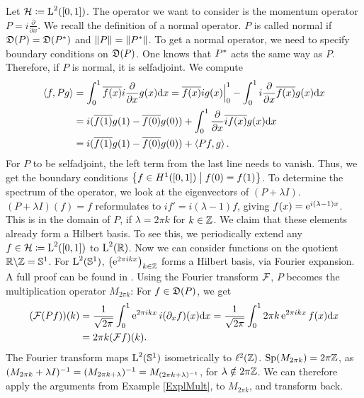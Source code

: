 \begin{expl}
 
 Let $\mathcal{H} \coloneqq \text{L}^2(\left[ 0, 1 \right])$. 
 The operator we want to consider is the momentum operator 
 $P = i \frac{\partial}{\partial x}$.
 We recall the definition of a normal operator.
 $P$ is called normal if $\mathfrak{D}(P) = \mathfrak{D}(P^{*})$ and 
 $\|P\| = \| P ^{*} \|$. To get a normal operator, we
 need to specify boundary conditions on $\mathfrak{D}(P)$. One knows that
 $P^{*}$ acts the same way as $P$. Therefore, if $P$ is normal,
 it is selfadjoint.
 We compute
 \begin{align*}
  \left\langle f, Pg \right\rangle 
 & =\int _0 ^1 \overline{f(x)} i \frac{\partial}{\partial x}g(x) \text{d}x
  = \overline{f(x)}ig(x)\Bigr|^{1}_{0}
  -\int _0 ^1 i \frac{\partial}{\partial x}\overline{f(x)} g(x) \text{d}x\\
&= i(\overline{f(1)}g(1)- \overline{f(0)}g(0))
+ \int _0 ^1 \frac{\partial}{\partial x}\overline{i f(x)} g(x) \text{d}x\\
&=i(\overline{f(1)}g(1)- \overline{f(0)}g(0)) 
+\left\langle Pf, g \right\rangle.
 \end{align*}
For $P$ to be selfadjoint, the left term from the last line needs 
to vanish. Thus, we get the boundary conditions 
 $\left\lbrace f \in H^1(\left[ 0,1 \right]) \bigm| f(0) = f(1) \right\rbrace$.
 To determine the spectrum of the operator, we look at 
 the eigenvectors of $(P+\lambda I)$.
 $(P+\lambda I)(f)=f$ reformulates to $i f' = i(\lambda - 1)f$, giving
 $f(x)= \operatorname{e}^{i(\lambda -1 )x}$. This is in the domain of $P$, if 
 $\lambda = 2\pi k$ for $k \in \mathbb{Z}$. We claim that these elements
 already form a Hilbert basis. To see this, we periodically
 extend any
 $f \in \mathcal{H} \coloneqq \text{L}^2(\left[ 0, 1 \right])$ to 
 $\text{L}^2(\mathbb{R})$. Now we can consider functions on the quotient 
 $\mathbb{R} \backslash \mathbb{Z} = \mathbb{S}^1$. For $\text{L}^2(\mathbb{S}^1)$,
 $\left(\operatorname{e}^{2\pi i k x }\right)_{k \in \mathbb{Z}}$ forms a Hilbert basis, via
 Fourier expansion. A full proof can be found in 
 \cite[Ch. V.4]{WernerFunkAna}.
 Using the Fourier transform $\mathcal{F}$, $P$ becomes the multiplication operator
 $M_{2 \pi k}$: For $f \in \mathfrak{D}(P)$, we get
 \begin{align*}
  (\mathcal{F}(Pf))(k)
  &= \frac{1}{\sqrt{2\pi}} \int _0 ^1 \operatorname{e}^{2\pi i k x}i(\partial_xf)(x)\text{d}x
  = \frac{1}{\sqrt{2\pi}} \int _0 ^1 2 \pi k \operatorname{e}^{2\pi i k x}f(x)\text{d}x \\
  &= 2 \pi k (\mathcal{F}f)(k).
 \end{align*}
The Fourier transform maps $\text{L}^2(\mathbb{S}^1)$ isometrically
to $\ell^2(\mathbb{Z})$. $\operatorname{Sp}(M_{2\pi k}) = 2\pi \mathbb{Z}$, as 
$(M_{2 \pi k } + \lambda I)^{-1} = (M_{2 \pi k + \lambda})^{-1}
= M_{(2 \pi k + \lambda)^{-1}}$, for $\lambda \notin 2\pi \mathbb{Z}$.
We can therefore apply the arguments from Example
\ref{ExplMult}, to $M_{2 \pi k}$, and transform back.

\end{expl}

